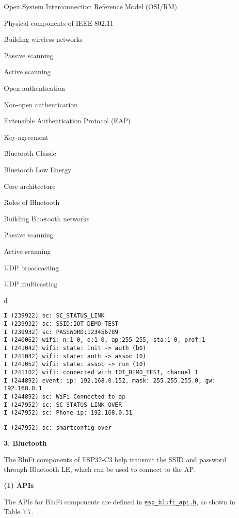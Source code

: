 \documentclass[a4paper,12pt]{book}
\begin{document}
\begin{term}{Open System Interconnection Reference Model (OSI/RM)}
\begin{term}{Physical components of IEEE 802.11}
\begin{term}{Building wireless networks}
\begin{term}{Passive scanning}
\begin{term}{Active scanning}
\begin{term}{Open authentication}
\begin{term}{Non-open authentication}
\begin{term}{Extensible Authentication Protocol (EAP)}
\begin{term}{Key agreement}
\begin{term}{Bluetooth Classic}
\begin{term}{Bluetooth Low Energy}
\begin{term}{Core architecture}
\begin{term}{Roles of Bluetooth}
\begin{term}{Building Bluetooth networks}
\begin{term}{Passive scanning}
\begin{term}{Active scanning}
\begin{term}{UDP broadcasting}
\begin{term}{UDP multicasting}
\begin{tabular}{d}
\vspace{2pt}
\begin{verbatim}
I (239922) sc: SC_STATUS_LINK
I (239932) sc: SSID:IOT_DEMO_TEST
I (239932) sc: PASSWORD:123456789
I (240062) wifi: n:1 0, o:1 0, ap:255 255, sta:1 0, prof:1
I (241042) wifi: state: init -> auth (b0)
I (241042) wifi: state: auth -> assoc (0)
I (241052) wifi: state: assoc -> run (10)
I (241102) wifi: connected with IOT_DEMO_TEST, channel 1
I (244892) event: ip: 192.168.0.152, mask: 255.255.255.0, gw: 192.168.0.1
I (244892) sc: WiFi Connected to ap
I (247952) sc: SC_STATUS_LINK_OVER
I (247952) sc: Phone ip: 192.168.0.31
\end{verbatim}
\verb|I (247952) sc: smartconfig over|
\end{tabular}


\textbf{3. Bluetooth}

The BluFi components of ESP32-C3 help transmit the SSID and password through Bluetooth LE, which can be used to connect to the AP.

\textbf{(1) APIs}

The APIs for BluFi components are defined in \href{https://github.com/espressif/esp-idf/blob/master/components/bt/common/api/include/api/esp_blufi_api.h}{\texttt{esp\_blufi\_api.h}}, as shown in Table 7.7.


\end{term}
\end{term}
\end{term}
\end{term}
\end{term}
\end{term}
\end{term}
\end{term}
\end{term}
\end{term}
\end{term}
\end{term}
\end{term}
\end{term}
\end{term}
\end{term}
\end{term}
\end{term}
\end{document}
